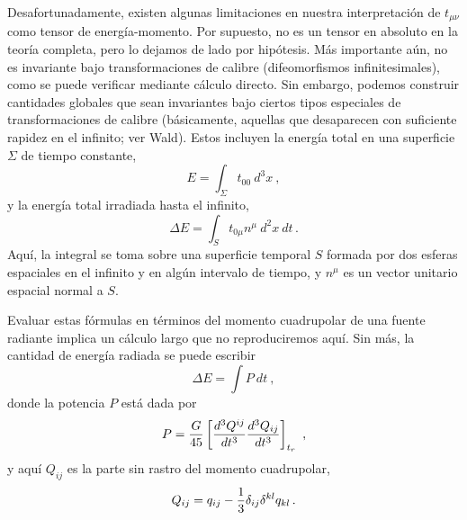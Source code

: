 \documentclass[11pt,b5paper,openany,twoside]{book}
\newcommand{\mn}{{\mu\nu}}
\begin{document}
Desafortunadamente, existen algunas limitaciones en nuestra interpretación de $t_\mn$ como tensor de energía-momento.
Por supuesto, no es un tensor en absoluto en la teoría completa, pero lo dejamos de lado por hipótesis.
Más importante aún, no es invariante bajo transformaciones de calibre (difeomorfismos infinitesimales), como se puede verificar mediante cálculo directo.
Sin embargo, podemos construir cantidades globales que sean invariantes bajo ciertos tipos especiales de transformaciones de calibre (básicamente, aquellas que desaparecen con suficiente rapidez en el infinito; ver Wald).
Estos incluyen la energía total en una superficie $\Sigma$ de tiempo constante,
\begin{equation}
E=\int_\Sigma t_{00}~d^3x\ ,\label{6.102}
\end{equation}
y la energía total irradiada hasta el infinito,
\begin{equation}
\Delta E = \int_S t_{0\mu} n^\mu ~d^2x~dt\,.\label{6.103}
\end{equation}
Aquí, la integral se toma sobre una superficie temporal $S$ formada por dos esferas espaciales en el infinito y en algún intervalo de tiempo, y $n^\mu$ es un vector unitario espacial normal a $S$.

Evaluar estas fórmulas en términos del momento cuadrupolar de una fuente radiante implica un cálculo largo que no reproduciremos aquí.
Sin más, la cantidad de energía radiada se puede escribir
\begin{equation}
\Delta E = \int P ~dt\ ,\label{6.104}
\end{equation}
donde la potencia $P$ está dada por
\begin{equation}
P = {{G}\over {45}}\left[{{d^3 Q^{ij}}\over{dt^3}}
{{d^3 Q_{ij}}\over{dt^3}}\right]_{t_r}\ ,\label{6.105}
\end{equation}
y aquí $Q_{ij}$ es la parte sin rastro del momento cuadrupolar,
\begin{equation}
Q_{ij} = q_{ij}-{1\over 3}\delta_{ij} \delta^{kl}
q_{kl}\,.\label{6.106}
\end{equation}
\end{document}
